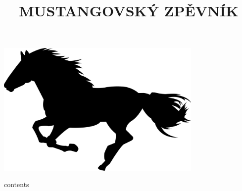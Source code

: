 \documentclass[12pt,twoside]{article}
\title{\Huge{\textsf{\textbf{MUSTANGOVSKÝ ZPĚVNÍK}}}}
\date{}
\begin{document}
	\maketitle
	\thispagestyle{empty}
	\begin{center}
	\includegraphics[width=0.75\textwidth]{cover}
	\end{center}
	\newpage
  	\newpage
	
	\MultiwordChords
	\begin{songs}{contents}
	
	\end{songs}

\end{document}
